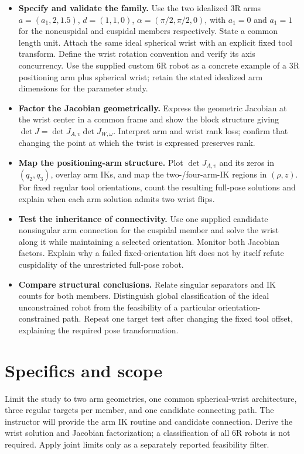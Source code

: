 \documentclass[11pt,a4paper]{article}
\begin{document}
\begin{itemize}
  \item \textbf{Specify and validate the family.} Use the two idealized 3R arms
$a=(a_1,2,1.5)$, $d=(1,1,0)$, $\alpha=(\pi/2,\pi/2,0)$, with $a_1=0$
and $a_1=1$ for the noncuspidal and cuspidal members respectively. State a
common length unit. Attach the same ideal spherical wrist with an explicit fixed
tool transform. Define the wrist rotation convention and verify its axis
concurrency. Use the supplied custom 6R robot as a concrete example of a
3R positioning arm plus spherical wrist; retain the stated idealized arm
dimensions for the parameter study.

  \item \textbf{Factor the Jacobian geometrically.} Express the geometric Jacobian at
the wrist center in a common frame and show the block structure giving
$\det J=\det J_{A,v}\det J_{W,\omega}$. Interpret arm and wrist rank loss;
confirm that changing the point at which the twist is expressed preserves rank.

  \item \textbf{Map the positioning-arm structure.} Plot $\det J_{A,v}$ and its zeros
in $(q_2,q_3)$, overlay arm IKs, and map the two-/four-arm-IK regions in
$(\rho,z)$. For fixed regular tool orientations, count the resulting full-pose
solutions and explain when each arm solution admits two wrist flips.

  \item \textbf{Test the inheritance of connectivity.} Use one supplied candidate
nonsingular arm connection for the cuspidal member and solve the wrist along
it while maintaining a selected orientation. Monitor both Jacobian factors.
Explain why a failed fixed-orientation lift does not by itself refute
cuspidality of the unrestricted full-pose robot.

  \item \textbf{Compare structural conclusions.} Relate singular separators and IK
counts for both members. Distinguish global classification of the ideal
unconstrained robot from the feasibility of a particular orientation-constrained
path. Repeat one target test after changing the fixed tool offset, explaining
the required pose transformation.
\end{itemize}

\newpage
\section*{Specifics and scope}
Limit the study to two arm geometries, one common spherical-wrist
architecture, three regular targets per member, and one candidate connecting
path. The instructor will provide the arm IK routine and candidate connection.
Derive the wrist solution and Jacobian factorization; a classification of all
6R robots is not required. Apply joint limits only as a separately reported
feasibility filter.
\end{document}

